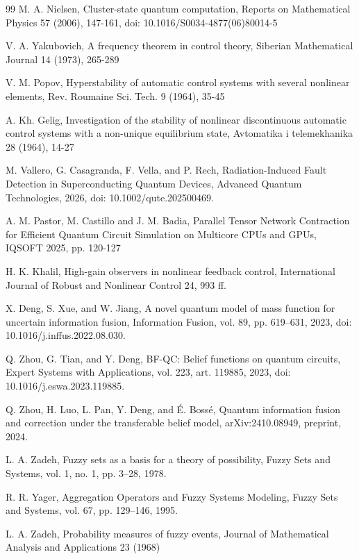 \documentclass[final,3p,times]{elsarticle}
\begin{document}
\begin{thebibliography}{99}
 M. A. Nielsen, Cluster-state quantum computation, Reports on Mathematical Physics 57 (2006), 147-161, doi: 10.1016/S0034-4877(06)80014-5

 V. A. Yakubovich, A frequency theorem in control theory, Siberian Mathematical Journal 14 (1973), 265-289

 V. M. Popov, Hyperstability of automatic control systems with several nonlinear elements, Rev. Roumaine Sci. Tech. 9 (1964), 35-45

 A. Kh. Gelig, Investigation of the stability of nonlinear discontinuous automatic control systems with a non-unique equilibrium state, Avtomatika i telemekhanika 28 (1964), 14-27

 M. Vallero, G. Casagranda, F. Vella, and P. Rech, Radiation-Induced Fault Detection in Superconducting Quantum Devices, Advanced Quantum Technologies, 2026, doi: 10.1002/qute.202500469.

 A. M. Pastor, M. Castillo and J. M. Badia, Parallel Tensor Network Contraction for Efficient Quantum Circuit Simulation on Multicore CPUs and GPUs, IQSOFT 2025, pp. 120-127

 H. K. Khalil, High-gain observers in nonlinear feedback control, International Journal of Robust and Nonlinear Control 24, 993 ff.

 X. Deng, S. Xue, and W. Jiang, A novel quantum model of mass function for uncertain information fusion, Information Fusion, vol. 89, pp. 619--631, 2023, doi: 10.1016/j.inffus.2022.08.030.

 Q. Zhou, G. Tian, and Y. Deng, BF-QC: Belief functions on quantum circuits, Expert Systems with Applications, vol. 223, art. 119885, 2023, doi: 10.1016/j.eswa.2023.119885.

 Q. Zhou, H. Luo, L. Pan, Y. Deng, and \'E. Boss\'e, Quantum information fusion and correction under the transferable belief model, arXiv:2410.08949, preprint, 2024.

 L. A. Zadeh, Fuzzy sets as a basis for a theory of possibility, Fuzzy Sets and Systems, vol. 1, no. 1, pp. 3--28, 1978.

 R. R. Yager, Aggregation Operators and Fuzzy Systems Modeling, Fuzzy Sets and Systems, vol. 67, pp. 129--146, 1995.

 L. A. Zadeh, Probability measures of fuzzy events, Journal of Mathematical Analysis and Applications 23 (1968)


\end{thebibliography}
\end{document}
